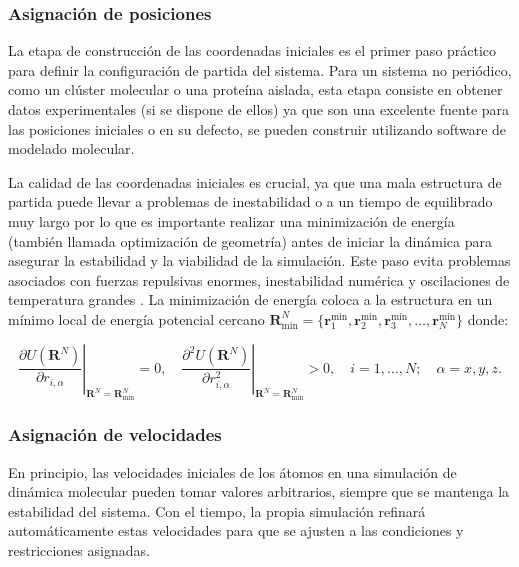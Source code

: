 \subsubsection*{Asignación de posiciones}

La etapa de construcción de las coordenadas iniciales es el primer paso práctico para definir la configuración de partida del sistema. Para un sistema no periódico, como un clúster molecular o una proteína aislada, esta etapa consiste en obtener datos experimentales (si se dispone de ellos) ya que son una excelente fuente para las posiciones iniciales o en su defecto, se pueden construir utilizando software de modelado molecular.

La calidad de las coordenadas iniciales es crucial, ya que una mala estructura de partida puede llevar a problemas de inestabilidad o a un tiempo de equilibrado muy largo por lo que es importante realizar una minimización de energía (también llamada optimización de geometría) antes de iniciar la dinámica para asegurar la estabilidad y la viabilidad de la simulación.  Este paso evita problemas asociados con fuerzas repulsivas enormes, inestabilidad numérica y oscilaciones de temperatura grandes \cite{haile1992molecular}. La minimización de energía coloca a la estructura en un mínimo local de energía potencial cercano $\mathbf{R}_{\text{min}}^N = \{ \mathbf{r}_1^{\text{min}}, \mathbf{r}_2^{\text{min}}, \mathbf{r}_3^{\text{min}}, \ldots, \mathbf{r}_N^{\text{min}} \}$ donde:

\begin{equation}
    \label{eq:minimizacion_energia}
    \left.\frac{\partial U(\mathbf{R}^N)}{\partial r_{i,\alpha}}\right|_{\mathbf{R}^N = \mathbf{R}^N_{\text{min}}} = 0, \quad
    \left.\frac{\partial^2 U(\mathbf{R}^N)}{\partial r_{i,\alpha}^2}\right|_{\mathbf{R}^N = \mathbf{R}^N_{\text{min}}} > 0, \quad
    i = 1, \ldots, N; \quad \alpha = x, y, z.
\end{equation}

\subsubsection*{Asignación de velocidades}

En principio, las velocidades iniciales de los átomos en una simulación de dinámica molecular pueden tomar valores arbitrarios, siempre que se mantenga la estabilidad del sistema. Con el tiempo, la propia simulación refinará automáticamente estas velocidades para que se ajusten a las condiciones y restricciones asignadas.

